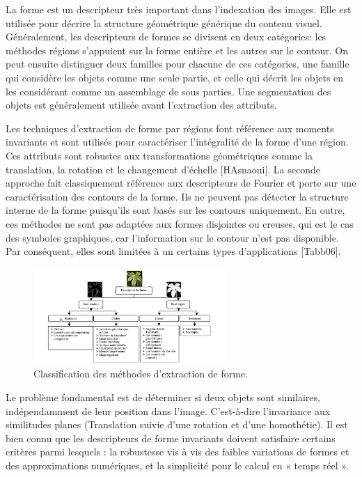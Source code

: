 La forme est un descripteur très important dans l'indexation des images. Elle est utilisée pour décrire la structure géométrique générique du contenu visuel. Généralement, les descripteurs de formes se divisent en deux catégories: les méthodes régions s'appuient sur la forme entière et les autres sur le contour. On peut ensuite distinguer deux familles pour chacune de ces catégories, une famille qui considère les objets comme une seule partie, et celle qui décrit les objets en les considérant comme un assemblage de sous parties. Une segmentation des objets est généralement utilisée avant l'extraction des attributs.

Les techniques d’extraction de forme par régions font référence aux moments invariants et sont utilisés pour caractériser l’intégralité de la forme d’une région. Ces attributs sont robustes aux transformations géométriques comme la translation, la rotation et le changement d’échelle [HAsnaoui]. La seconde approche fait classiquement référence aux descripteurs de Fourier et porte sur une caractérisation des contours de la forme. Ils ne peuvent pas détecter la structure interne de la forme puisqu’ils sont basés sur les contours uniquement. En outre, ces méthodes ne sont pas adaptées aux formes disjointes ou creuses, qui est le cas des symboles graphiques, car l’information sur le contour n’est pas disponible. Par conséquent, elles sont limitées à un certains types d’applications [Tabb06].

\begin{figure}[H]
	\label{fig:forme}
	\centering
	\includegraphics[width=0.65\textwidth]{Figures/forme} %
	
	\caption{Classification des méthodes d'extraction de forme.}
	
\end{figure}

Le problème fondamental est de déterminer si deux objets sont similaires, indépendamment
de leur position dans l’image. C’est-à-dire l’invariance aux similitudes planes (Translation suivie d'une rotation et d’une homothétie). Il est bien connu que les descripteurs de forme invariants doivent satisfaire certains critères parmi lesquels : la robustesse vis à vis des faibles variations de formes et des approximations numériques, et la simplicité pour le calcul en « temps réel ».

